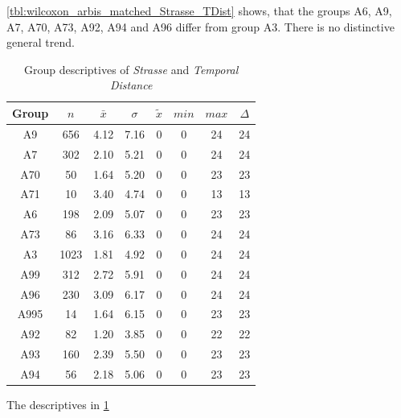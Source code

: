 \cref{tbl:wilcoxon_arbis_matched_Strasse_TDist} shows, that the groups A6, A9, A7, A70, A73, A92, A94 and A96 differ from group A3. There is no distinctive general trend.
\begin{table}[ht!]
	\tiny
	\centering
	\begin{tabular}{c|c|c|c|c|c|c|c}
		\toprule
		Group & $n$ & $\bar{x}$ & $\sigma$ & $\tilde{x}$ & $min$ & $max$ & $\Delta$ \\
		\midrule
		A9   & 656  & 4.12 & 7.16 & 0 & 0 & 24 & 24 \\ 
		A7   & 302  & 2.10 & 5.21 & 0 & 0 & 24 & 24 \\ 
		A70  & 50   & 1.64 & 5.20 & 0 & 0 & 23 & 23 \\ 
		A71  & 10   & 3.40 & 4.74 & 0 & 0 & 13 & 13 \\ 
		A6   & 198  & 2.09 & 5.07 & 0 & 0 & 23 & 23 \\ 
		A73  & 86   & 3.16 & 6.33 & 0 & 0 & 24 & 24 \\ 
		A3   & 1023 & 1.81 & 4.92 & 0 & 0 & 24 & 24 \\ 
		A99  & 312  & 2.72 & 5.91 & 0 & 0 & 24 & 24 \\ 
		A96  & 230  & 3.09 & 6.17 & 0 & 0 & 24 & 24 \\ 
		A995 & 14   & 1.64 & 6.15 & 0 & 0 & 23 & 23 \\ 
		A92  & 82   & 1.20 & 3.85 & 0 & 0 & 22 & 22 \\ 
		A93  & 160  & 2.39 & 5.50 & 0 & 0 & 23 & 23 \\ 
		A94  & 56   & 2.18 & 5.06 & 0 & 0 & 23 & 23 \\ 
		\bottomrule
	\end{tabular}
	\caption{Group descriptives of \textit{Strasse} and \textit{Temporal Distance}}
	\label{tbl:descriptives_arbis_matched_Strasse_TDist}
\end{table}
The descriptives in \cref{tbl:descriptives_arbis_matched_Strasse_TDist}

